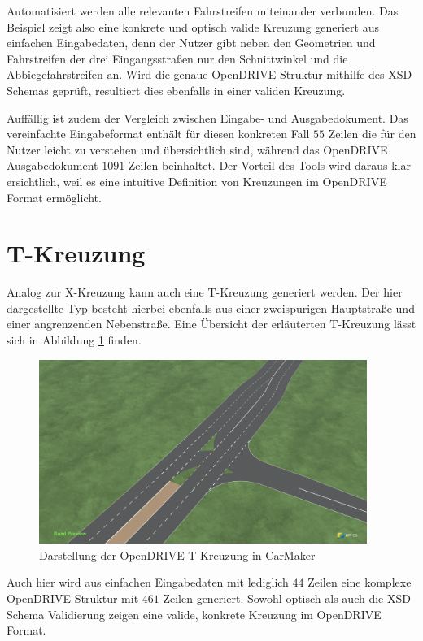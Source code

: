 Automatisiert werden alle relevanten Fahrstreifen miteinander verbunden. Das Beispiel zeigt also eine konkrete und optisch valide Kreuzung generiert aus einfachen Eingabedaten, denn der Nutzer gibt neben den Geometrien und Fahrstreifen der drei Eingangsstraßen nur den Schnittwinkel und die Abbiegefahrstreifen an. Wird die genaue OpenDRIVE Struktur mithilfe des XSD Schemas geprüft, resultiert dies ebenfalls in einer validen Kreuzung.

Auffällig ist zudem der Vergleich zwischen Eingabe- und Ausgabedokument. Das vereinfachte Eingabeformat enthält für diesen konkreten Fall \(55\) Zeilen die für den Nutzer leicht zu verstehen und übersichtlich sind, während das OpenDRIVE Ausgabedokument \(1091\) Zeilen beinhaltet. Der Vorteil des Tools wird daraus klar ersichtlich, weil es eine intuitive Definition von Kreuzungen im OpenDRIVE Format ermöglicht.

\section{T-Kreuzung}
Analog zur X-Kreuzung kann auch eine T-Kreuzung generiert werden. Der hier dargestellte Typ besteht hierbei ebenfalls aus einer zweispurigen Hauptstraße und einer angrenzenden Nebenstraße. Eine Übersicht der erläuterten T-Kreuzung lässt sich in Abbildung \ref{abb7} finden.

\begin{figure}[H]
\flushleft
\includegraphics[width=0.95\textwidth]{fig/junction6.png}
\caption{Darstellung der OpenDRIVE T-Kreuzung in CarMaker}
\label{abb7}
\end{figure}

Auch hier wird aus einfachen Eingabedaten mit lediglich \(44\) Zeilen eine komplexe OpenDRIVE Struktur mit \(461\) Zeilen generiert. Sowohl optisch als auch die XSD Schema Validierung zeigen eine valide, konkrete Kreuzung im OpenDRIVE Format.

